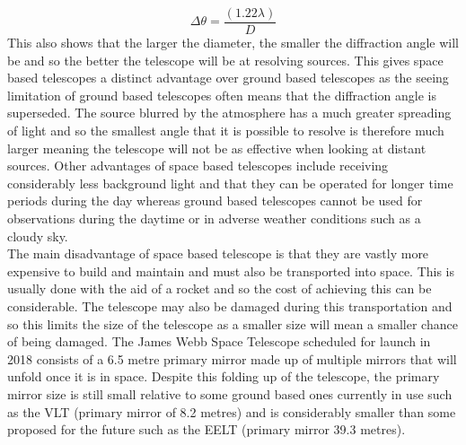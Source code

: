 \documentclass[pdf,color]{UoBnote}
\begin{document}
\begin{equation}
\Delta\theta= \frac{(1.22 \lambda)}D
\end{equation}                                  
\newline
This also shows that the larger the diameter, the smaller the diffraction angle will be and so the better the telescope will be at resolving sources. This gives space based telescopes a distinct advantage over ground based telescopes as the seeing limitation of ground based telescopes often means that the diffraction angle is superseded. The source blurred by the atmosphere has a much greater spreading of light and so the smallest angle that it is possible to resolve is therefore much larger meaning the telescope will not be as effective when looking at distant sources. Other advantages of space based telescopes include receiving considerably less background light and that they can be operated for longer time periods during the day whereas ground based telescopes cannot be used for observations during the daytime or in adverse weather conditions such as a cloudy sky.\\
\newline
The main disadvantage of space based telescope is that they are vastly more expensive to build and maintain and must also be transported into space. This is usually done with the aid of a rocket and so the cost of achieving this can be considerable. The telescope may also be damaged during this transportation and so this limits the size of the telescope as a smaller size will mean a smaller chance of being damaged. The James Webb Space Telescope scheduled for launch in 2018 consists of a 6.5 metre primary mirror made up of multiple mirrors that will unfold once it is in space. Despite this folding up of the telescope, the primary mirror size is still small relative to some ground based ones currently in use such as the VLT (primary mirror of 8.2 metres) and is considerably smaller than some proposed for the future such as the EELT (primary mirror 39.3 metres). \\
\end{document}

